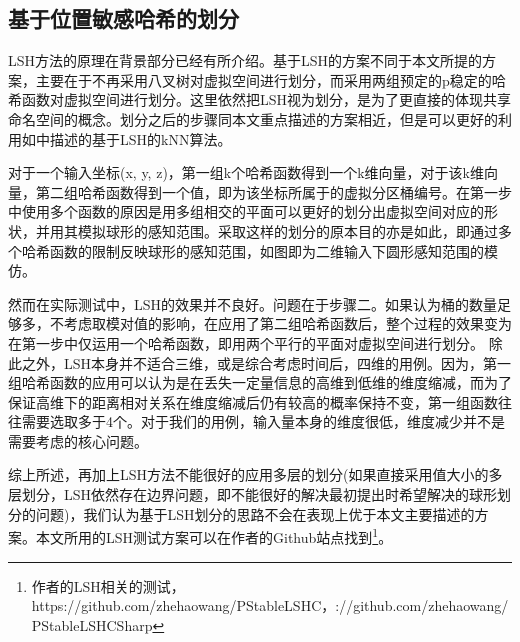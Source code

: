 \subsection{基于位置敏感哈希的划分}
\par
LSH方法的原理在背景部分已经有所介绍。基于LSH的方案不同于本文所提的方案，主要在于不再采用八叉树对虚拟空间进行划分，而采用两组预定的p稳定的哈希函数对虚拟空间进行划分。这里依然把LSH视为划分，是为了更直接的体现共享命名空间的概念。划分之后的步骤同本文重点描述的方案相近，但是可以更好的利用如\cite{LSHKNNRef}中描述的基于LSH的kNN算法。
\par
对于一个输入坐标(x, y, z)，第一组k个哈希函数得到一个k维向量，对于该k维向量，第二组哈希函数得到一个值，即为该坐标所属于的虚拟分区桶编号。在第一步中使用多个函数的原因是用多组相交的平面可以更好的划分出虚拟空间对应的形状，并用其模拟球形的感知范围。采取这样的划分的原本目的亦是如此，即通过多个哈希函数的限制反映球形的感知范围，如图即为二维输入下圆形感知范围的模仿。
\par
然而在实际测试中，LSH的效果并不良好。问题在于步骤二。如果认为桶的数量足够多，不考虑取模对值的影响，在应用了第二组哈希函数后，整个过程的效果变为在第一步中仅运用一个哈希函数，即用两个平行的平面对虚拟空间进行划分。
除此之外，LSH本身并不适合三维，或是综合考虑时间后，四维的用例。因为，第一组哈希函数的应用可以认为是在丢失一定量信息的高维到低维的维度缩减，而为了保证高维下的距离相对关系在维度缩减后仍有较高的概率保持不变，第一组函数往往需要选取多于4个。对于我们的用例，输入量本身的维度很低，维度减少并不是需要考虑的核心问题。
\par
综上所述，再加上LSH方法不能很好的应用多层的划分(如果直接采用值大小的多层划分，LSH依然存在边界问题，即不能很好的解决最初提出时希望解决的球形划分的问题)，我们认为基于LSH划分的思路不会在表现上优于本文主要描述的方案。本文所用的LSH测试方案可以在作者的Github站点找到\footnote{作者的LSH相关的测试，https://github.com/zhehaowang/PStableLSHC，://github.com/zhehaowang/PStableLSHCSharp}。
